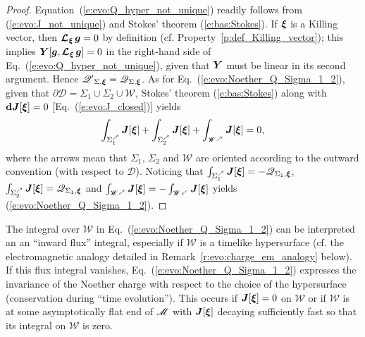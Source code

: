 \begin{proof}
Equation~(\ref{e:evo:Q_hyper_not_unique}) readily follows from (\ref{e:evo:J_not_unique}) and
Stokes' theorem (\ref{e:bas:Stokes}). If $\bm{\xi}$ is a Killing vector, then
$\bm{\mathcal{L}}_{\bm{\xi}}\,\bm{g}= 0$ by definition (cf. Property~\ref{p:def_Killing_vector}); this implies
$\bm{Y}[\bm{g},\bm{\mathcal{L}}_{\bm{\xi}}\,\bm{g}] = 0$ in the
right-hand side of Eq.~(\ref{e:evo:Q_hyper_not_unique}), given that
$\bm{Y}$ must be linear in its second argument. Hence
$\mathscr{Q'}_{\Sigma,\bm{\xi}} = \mathscr{Q}_{\Sigma,\bm{\xi}}$.
As for Eq.~(\ref{e:evo:Noether_Q_Sigma_1_2}),
given that $\partial\mathscr{D} = \Sigma_1\cup\Sigma_2\cup\mathscr{W}$, Stokes' theorem (\ref{e:bas:Stokes})
along with $\mathbf{d} \bm{J}[\bm{\xi}] = 0$ [Eq.~(\ref{e:evo:J_closed})] yields
\[
     \int_{\Sigma_1^{\nearrow}} \bm{J}[\bm{\xi}] + \int_{\Sigma_2^{\nearrow}} \bm{J}[\bm{\xi}]
      + \int_{\mathscr{W}^{\nearrow}} \bm{J}[\bm{\xi}] = 0 ,
\]
where the arrows mean that $\Sigma_1$, $\Sigma_2$ and $\mathscr{W}$ are oriented according to the outward
convention (with respect to $\mathscr{D}$).
Noticing that $\int_{\Sigma_1^{\nearrow}} \bm{J}[\bm{\xi}] = -\mathscr{Q}_{\Sigma_1,\bm{\xi}}$,
$\int_{\Sigma_2^{\nearrow}} \bm{J}[\bm{\xi}] = \mathscr{Q}_{\Sigma_1,\bm{\xi}}$
and $\int_{\mathscr{W}^{\nearrow}} \bm{J}[\bm{\xi}] = - \int_{\mathscr{W}^{\swarrow}} \bm{J}[\bm{\xi}]$
yields (\ref{e:evo:Noether_Q_Sigma_1_2}).
\end{proof}

The integral over $\mathscr{W}$ in Eq.~(\ref{e:evo:Noether_Q_Sigma_1_2}) can be interpreted an
an ``inward flux'' integral, especially if $\mathscr{W}$ is a timelike hypersurface
(cf. the electromagnetic analogy detailed in Remark~\ref{r:evo:charge_em_analogy} below).
If this flux integral vanishes,
Eq.~(\ref{e:evo:Noether_Q_Sigma_1_2}) expresses the
invariance of the Noether charge with respect to the choice of the hypersurface
(conservation during ``time evolution''). This occurs
if $\bm{J}[\bm{\xi}] = 0$ on $\mathscr{W}$ or if  $\mathscr{W}$ is at some asymptotically flat end
of $\mathscr{M}$ with $\bm{J}[\bm{\xi}]$ decaying sufficiently fast so that its integral on $\mathscr{W}$ is zero.

